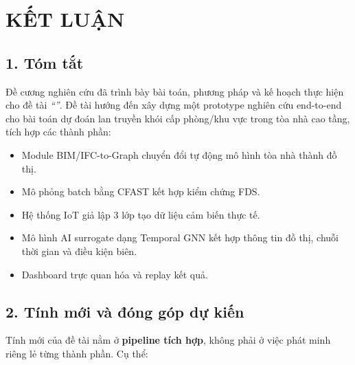 
\chapter*{KẾT LUẬN}

\section*{1. Tóm tắt}

Đề cương nghiên cứu đã trình bày bài toán, phương pháp và kế hoạch thực hiện cho đề tài \textit{``\detai''}. Đề tài hướng đến xây dựng một prototype nghiên cứu end-to-end cho bài toán dự đoán lan truyền khói cấp phòng/khu vực trong tòa nhà cao tầng, tích hợp các thành phần:

\begin{itemize}
  \item Module BIM/IFC-to-Graph chuyển đổi tự động mô hình tòa nhà thành đồ thị.
  \item Mô phỏng batch bằng CFAST kết hợp kiểm chứng FDS.
  \item Hệ thống IoT giả lập 3 lớp tạo dữ liệu cảm biến thực tế.
  \item Mô hình AI surrogate dạng Temporal GNN kết hợp thông tin đồ thị, chuỗi thời gian và điều kiện biên.
  \item Dashboard trực quan hóa và replay kết quả.
\end{itemize}

\section*{2. Tính mới và đóng góp dự kiến}

Tính mới của đề tài nằm ở \textbf{pipeline tích hợp}, không phải ở việc phát minh riêng lẻ từng thành phần. Cụ thể:

